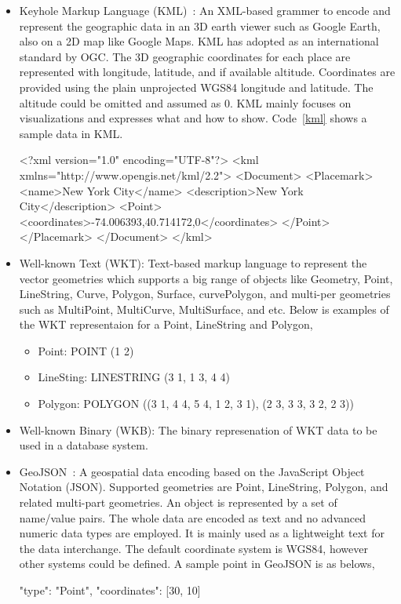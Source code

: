 \documentclass[a4paper,12pt]{article}
\begin{document}
\begin{itemize}
\item Keyhole Markup Language (KML)~\cite{kml}: An XML-based grammer to encode and represent the geographic data in an 3D earth viewer such as Google Earth, also on a 2D map like Google Maps. KML has adopted as an international standard by OGC. The 3D geographic coordinates for each place are represented with longitude, latitude, and if available altitude. Coordinates are provided using the plain unprojected WGS84 longitude and latitude. The altitude could be omitted and assumed as $0$. KML mainly focuses on visualizations and expresses what and how to show. Code~\ref{kml} shows a sample data in KML. 
\vspace{10px}
\begin{fakeXML}[label=kml,caption=A simple KML example representing a Point]
<?xml version="1.0" encoding="UTF-8"?>
<kml xmlns="http://www.opengis.net/kml/2.2">
<Document>
<Placemark>
  <name>New York City</name>
  <description>New York City</description>
  <Point>
    <coordinates>-74.006393,40.714172,0</coordinates>
  </Point>
</Placemark>
</Document>
</kml>
\end{fakeXML} 
\vspace{10px}
\item Well-known Text (WKT): Text-based markup language to represent the vector geometries which supports a big range of objects like Geometry, Point, LineString, Curve, Polygon, Surface, curvePolygon, and multi-per geometries such as MultiPoint, MultiCurve, MultiSurface, and etc. Below is examples of the WKT representaion for a Point, LineString and Polygon,
\begin{itemize}
\item Point: POINT (1 2)
\item LineSting: LINESTRING (3 1, 1 3, 4 4)
\item Polygon: POLYGON ((3 1, 4 4, 5 4, 1 2, 3 1),
			(2 3, 3 3, 3 2, 2 3))
\end{itemize}
\item Well-known Binary (WKB): The binary represenation of WKT data to be used in a database system.
\item GeoJSON~\cite{www/geojson}: A geospatial data encoding based on the JavaScript Object Notation (JSON). Supported geometries are Point, LineString, Polygon, and related multi-part geometries. An object is represented by a set of name/value pairs. The whole data are encoded as text and no advanced numeric data types are employed. It is mainly used as a lightweight text for the data interchange. The default coordinate system is WGS84, however other systems could be defined. A sample point in GeoJSON is as belows,
\vspace{10px} 
\begin{fakeJSON}
{
    "type": "Point", 
    "coordinates": [30, 10]
}
\end{fakeJSON}
\vspace{10px}
\end{itemize}
\end{document}
